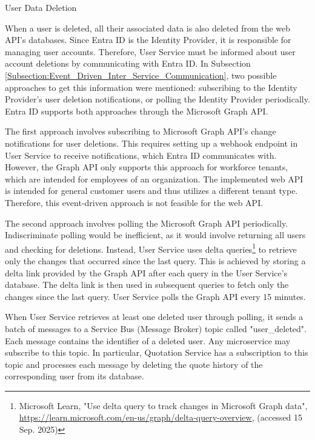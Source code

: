 \documentclass[12pt,reqno, oneside]{amsbook}
\makeatletter
\def\subsection{\@startsection{subsection}{2}%
      \z@{.5\linespacing\@plus.7\linespacing}{.25\linespacing}%
      {\normalfont\bfseries\flushleft}}
\theoremstyle{definition}
\theoremstyle{definition}
\numberwithin{section}{chapter}
\numberwithin{table}{chapter}
\numberwithin{figure}{chapter}
\makeatother
\begin{document}
\subsection{User Data Deletion}

When a user is deleted, all their associated data is also deleted from the web \ac{API}'s databases. Since Entra ID is the Identity Provider, it is responsible for managing user accounts. Therefore, User Service must be informed about user account deletions by communicating with Entra ID. In Subsection \ref{Subsection:Event_Driven_Inter_Service_Communication}, two possible approaches to get this information were mentioned: subscribing to the Identity Provider's user deletion notifications, or polling the Identity Provider periodically. Entra ID supports both approaches through the Microsoft Graph \ac{API}.

The first approach involves subscribing to Microsoft Graph \ac{API}'s change notifications for user deletions. This requires setting up a webhook endpoint in User Service to receive notifications, which Entra ID communicates with. However, the Graph \ac{API} only supports this approach for workforce tenants, which are intended for employees of an organization. The implemented web \ac{API} is intended for general customer users and thus utilizes a different tenant type. Therefore, this event-driven approach is not feasible for the web \ac{API}.

The second approach involves polling the Microsoft Graph \ac{API} periodically. Indiscriminate polling would be inefficient, as it would involve returning all users and checking for deletions. Instead, User Service uses delta queries\footnote{Microsoft Learn, "Use delta query to track changes in Microsoft Graph data", \url{https://learn.microsoft.com/en-us/graph/delta-query-overview}, (accessed 15 Sep. 2025)} to retrieve only the changes that occurred since the last query. This is achieved by storing a delta link provided by the Graph \ac{API} after each query in the User Service's database. The delta link is then used in subsequent queries to fetch only the changes since the last query. User Service polls the Graph \ac{API} every 15 minutes.

When User Service retrieves at least one deleted user through polling, it sends a batch of messages to a Service Bus (Message Broker) topic called "user\_deleted". Each message contains the identifier of a deleted user. Any microservice may subscribe to this topic. In particular, Quotation Service has a subscription to this topic and processes each message by deleting the quote history of the corresponding user from its database.
\end{document}
